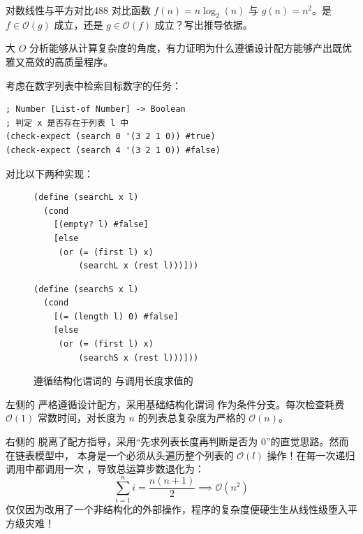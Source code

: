 \begin{exercise}{对数线性与平方对比}{488}\label{ex:488}
对比函数 $f(n) = n \log_2(n)$ 与 $g(n) = n^2$。是 $f \in \mathcal{O}(g)$ 成立，还是 $g \in \mathcal{O}(f)$ 成立？写出推导依据。
\end{exercise}


大 $O$ 分析能够从计算复杂度的角度，有力证明为什么遵循设计配方能够产出既优雅又高效的高质量程序。

考虑在数字列表中检索目标数字的任务：
\begin{lstlisting}[language=BSL]
; Number [List-of Number] -> Boolean
; 判定 x 是否存在于列表 l 中
(check-expect (search 0 '(3 2 1 0)) #true)
(check-expect (search 4 '(3 2 1 0)) #false)
\end{lstlisting}

对比以下两种实现：

\begin{figure}[htbp]
  \centering
  \begin{minipage}{0.48\textwidth}
\begin{lstlisting}[language=BSL]
(define (searchL x l)
  (cond
    [(empty? l) #false]
    [else
     (or (= (first l) x)
         (searchL x (rest l)))]))
\end{lstlisting}
  \end{minipage}
  \hfill
  \begin{minipage}{0.48\textwidth}
\begin{lstlisting}[language=BSL]
(define (searchS x l)
  (cond
    [(= (length l) 0) #false]
    [else
     (or (= (first l) x)
         (searchS x (rest l)))]))
\end{lstlisting}
  \end{minipage}
  \caption{遵循结构化谓词的  与调用长度求值的 }
  \label{fig:search-comparison}
\end{figure}

左侧的  严格遵循设计配方，采用基础结构化谓词  作为条件分支。每次检查耗费 $\mathcal{O}(1)$ 常数时间，对长度为 $n$ 的列表总复杂度为严格的 $\mathcal{O}(n)$。

右侧的  脱离了配方指导，采用“先求列表长度再判断是否为 0”的直觉思路。然而在链表模型中， 本身是一个必须从头遍历整个列表的 $\mathcal{O}(l)$ 操作！在每一次递归调用中都调用一次 ，导致总运算步数退化为：
\[ \sum_{i=1}^n i = \frac{n(n+1)}{2} \implies \mathcal{O}(n^2) \]
仅仅因为改用了一个非结构化的外部操作，程序的复杂度便硬生生从线性级堕入平方级灾难！

